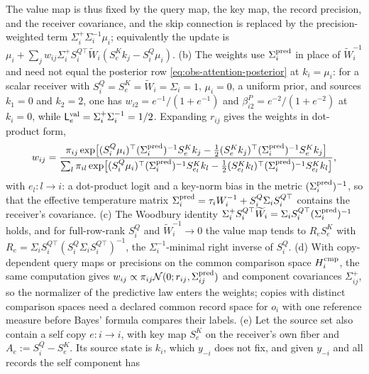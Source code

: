 The value map is thus fixed by the query map, the key map, the record
precision, and the receiver covariance, and the skip connection is replaced by
the precision-weighted term \(\Sigma_i^+\Sigma_i^{-1}\mu_i\); equivalently the
update is
\(\mu_i+\sum_jw_{ij}\Sigma_i^+S_i^{Q\top}\widetilde W_i(S^K_ek_j-S^Q_i\mu_i)\).
(b) The weights use \(\Sigma_i^{\rm pred}\) in place of \(\widetilde W_i^{-1}\)
and need not equal the posterior row \eqref{eq:obs-attention-posterior} at
\(k_i=\mu_i\): for a scalar receiver with
\(S^Q_i=S^K_e=\widetilde W_i=\Sigma_i=1\), \(\mu_i=0\), a uniform prior, and
sources \(k_1=0\) and \(k_2=2\), one has \(w_{i2}=e^{-1}/(1+e^{-1})\) and
\(\beta^P_{i2}=e^{-2}/(1+e^{-2})\) at \(k_i=0\), while
\(\mathsf L_e^{\rm val}=\Sigma_i^+\Sigma_i^{-1}=1/2\). Expanding \(r_{ij}\)
gives the weights in dot-product form,
\begin{equation}
w_{ij}=\frac{\pi_{ij}\exp\bigl[(S^Q_i\mu_i)^\top(\Sigma_i^{\rm pred})^{-1}S^K_ek_j
-\tfrac12(S^K_ek_j)^\top(\Sigma_i^{\rm pred})^{-1}S^K_ek_j\bigr]}
{\sum_l\pi_{il}\exp\bigl[(S^Q_i\mu_i)^\top(\Sigma_i^{\rm pred})^{-1}S^K_{e_l}k_l
-\tfrac12(S^K_{e_l}k_l)^\top(\Sigma_i^{\rm pred})^{-1}S^K_{e_l}k_l\bigr]},
\label{eq:obs-selective-record-dot-product}
\end{equation}
with \(e_l:l\to i\): a dot-product logit and a key-norm bias in the metric
\((\Sigma_i^{\rm pred})^{-1}\), so that the effective temperature matrix
\(\Sigma_i^{\rm pred}=\tau_iW_i^{-1}+S^Q_i\Sigma_iS_i^{Q\top}\) contains the
receiver's covariance. (c) The Woodbury identity
\(\Sigma_i^+S_i^{Q\top}\widetilde W_i=\Sigma_iS_i^{Q\top}(\Sigma_i^{\rm pred})^{-1}\)
holds, and for full-row-rank \(S^Q_i\) and \(\widetilde W_i^{-1}\to0\) the value
map tends to \(R_eS^K_e\) with
\(R_e=\Sigma_iS_i^{Q\top}(S^Q_i\Sigma_iS_i^{Q\top})^{-1}\), the
\(\Sigma_i^{-1}\)-minimal right inverse of \(S^Q_i\). (d) With copy-dependent
query maps or precisions on the common comparison space \(H_i^{\rm cmp}\), the
same computation gives
\(w_{ij}\propto\pi_{ij}\mathcal N(0;r_{ij},\Sigma_{ij}^{\rm pred})\) and
component covariances \(\Sigma_{ij}^+\), so the normalizer of the predictive
law enters the weights; copies with distinct comparison spaces need a declared
common record space for \(o_i\) with one reference measure before Bayes'
formula compares their labels. (e) Let the source set also contain a self copy
\(e:i\to i\), with key map \(S^K_e\) on the receiver's own fiber and
\(A_e:=S^Q_i-S^K_e\). Its source state is \(k_i\), which \(y_{-i}\) does not
fix, and given \(y_{-i}\) and all records the self component has
